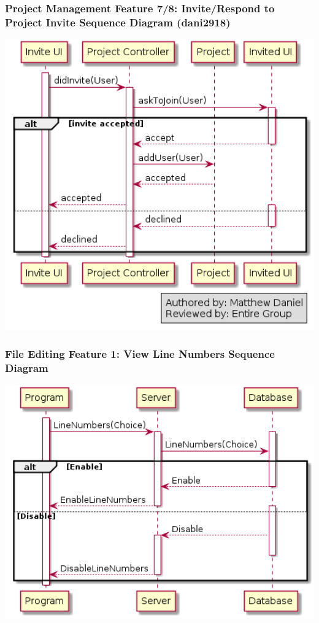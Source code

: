 \documentclass[twoside,letterpaper]{article}
\begin{document}
	\newpage
	
	\subsubsection[Project Management Feature 7/8: Invite/Respond to Project Invite Sequence Diagram (dani2918)]{\rmfamily\bfseries\color{black}
		Project Management Feature 7/8:  Invite/Respond to Project Invite Sequence Diagram (dani2918)}
	\label{pm:sd5}
	\bigskip
	
	\includegraphics[width=6.0in]{images/SequenceDiagrams/PMInviteToProject}
	\newpage
	
	\subsubsection[File Editing Feature 1: View Line Numbers Sequence Diagram]{\rmfamily\bfseries\color{black}
		File Editing Feature 1: View Line Numbers Sequence Diagram}
	\hypertarget{RefHeading22059017292}{}
	
	\bigskip
	
	\includegraphics[width=6.0in]{images/SequenceDiagrams/LineNumbers}
	
\end{document}
